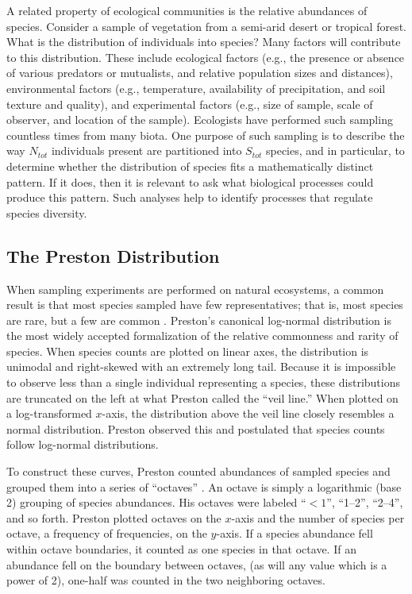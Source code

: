 A related property of ecological communities is the relative
abundances of species.  Consider a sample of vegetation from a
semi-arid desert or tropical forest.  What is the distribution of
individuals into species?  Many factors will contribute to this
distribution.  These include ecological factors (e.g., the presence or
absence of various predators or mutualists, and relative population
sizes and distances), environmental factors (e.g., temperature,
availability of precipitation, and soil texture and quality), and
experimental factors (e.g., size of sample, scale of observer, and
location of the sample).  Ecologists have performed such sampling
countless times from many biota.  One purpose of such
sampling is to describe the way $N_{tot}$ individuals present are
partitioned into $S_{tot}$ species, and in particular, to determine
whether the distribution of species fits a mathematically distinct
pattern.  If it does, then it is relevant to ask what biological
processes could produce this pattern.  Such analyses help to identify
processes that regulate species diversity.

\subsection{The Preston Distribution}
\label{preston-distribution}

When sampling experiments are performed on natural ecosystems, a
common result is that most species sampled have few representatives;
that is, most species are rare, but a few are common
\cite{Preston62a,May75,Brown81,Brown94}.  Preston's canonical
log-normal distribution is the most widely accepted formalization of
the relative commonness and rarity of species.  When species counts
are plotted on linear axes, the distribution is unimodal and
right-skewed with an extremely long tail.  Because it is impossible to
observe less than a single individual representing a species, these
distributions are truncated on the left at what Preston called the
``veil line.''  When plotted on a log-transformed $x$-axis, the
distribution above the veil line closely resembles a normal
distribution.  Preston observed this and postulated that species
counts follow log-normal distributions.

To construct these curves, Preston counted abundances of sampled
species and grouped them into a series of ``octaves''
\cite{Preston48}.  An octave is simply a logarithmic (base 2) grouping
of species abundances.  His octaves were labeled ``$<1$'', ``1--2'',
``2--4'', and so forth.  Preston plotted octaves on the $x$-axis and
the number of species per octave, a frequency of frequencies, on the
$y$-axis. If a species abundance fell within octave boundaries, it
counted as one species in that octave. If an abundance fell on the
boundary between octaves, (as will any value which is a power of 2),
one-half was counted in the two neighboring octaves.

